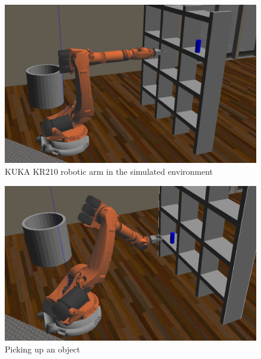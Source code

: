 \documentclass{article}
\begin{document}
\begin{figure}[H]
    \includegraphics[width=\linewidth]{KR210Model.png}
    \caption{KUKA KR210 robotic arm in the simulated environment}
    \label{fig:model}
\end{figure}
\begin{figure}[H]
    \includegraphics[width=\linewidth]{KR210Action2.png}
    \caption{Picking up an object}
    \label{fig:action2}
\end{figure}
\end{document}
